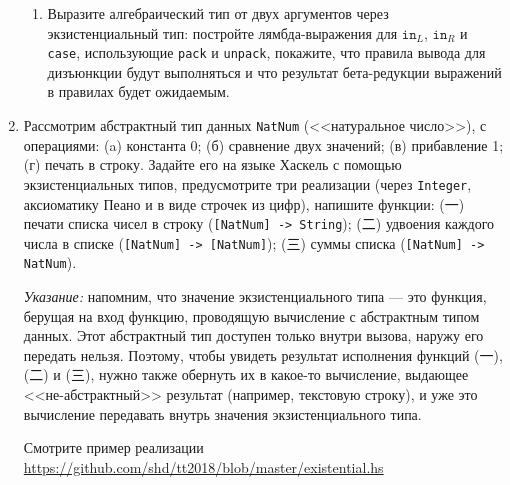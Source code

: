 \documentclass[10pt,a4paper,oneside]{article}
\begin{document}
\begin{CJK}{UTF8}{min}
\begin{enumerate}
\begin{enumerate}
\item Выразите алгебраический тип от двух аргументов через экзистенциальный тип:
постройте лямбда-выражения для $\texttt{in}_L$, $\texttt{in}_R$ и 
\texttt{case}, использующие \texttt{pack} и \texttt{unpack},
покажите, что правила вывода для дизъюнкции будут выполняться
и что результат бета-редукции выражений в правилах будет ожидаемым.

\end{enumerate}

\item Рассмотрим абстрактный тип данных \verb!NatNum! (<<натуральное число>>), с операциями: (a) константа 0;
(б) сравнение двух значений; (в) прибавление 1; (г) печать в строку. Задайте его на языке Хаскель
с помощью экзистенциальных типов, предусмотрите три реализации (через \verb!Integer!, аксиоматику
Пеано и в виде строчек из цифр), напишите функции: (一) печати списка чисел в строку
(\verb![NatNum] -> String!); (二) удвоения каждого числа в списке (\verb![NatNum] -> [NatNum]!);
(三) суммы списка (\verb![NatNum] -> NatNum!).

\emph{Указание:} напомним, что значение экзистенциального типа --- это функция, берущая на вход
функцию, проводящую вычисление с абстрактным типом данных. Этот абстрактный тип доступен только
внутри вызова, наружу его передать нельзя. 
Поэтому, чтобы увидеть результат исполнения функций (一), (二) и (三), нужно также обернуть 
их в какое-то вычисление, выдающее 
<<не-абстрактный>> результат (например, текстовую строку), и уже это вычисление передавать
внутрь значения экзистенциального типа.

Смотрите пример реализации \url{https://github.com/shd/tt2018/blob/master/existential.hs}

\end{enumerate}
\end{CJK}
\end{document}
